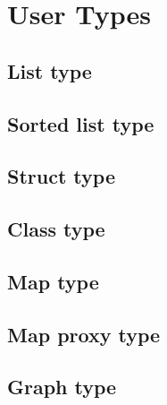
\chapter{User Types} \label{userTypes}


\section{List type}


\section{Sorted list type}


\section{Struct type}



\section{Class type}


\section{Map type}


\section{Map proxy type}




\section{Graph type}



